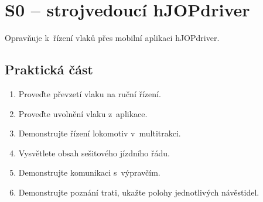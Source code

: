 \documentclass[12pt,a4paper]{article}
\begin{document}
\newpage

\section{S0 – strojvedoucí hJOPdriver}

Opravňuje k~řízení vlaků přes mobilní aplikaci hJOPdriver.

\subsection{Praktická část}

\begin{enumerate}[leftmargin=*]
\item Proveďte převzetí vlaku na ruční řízení.
\item Proveďte uvolnění vlaku z~aplikace.
\item Demonstrujte řízení lokomotiv v~multitrakci.
\item Vysvětlete obsah sešitového jízdního řádu.
\item Demonstrujte komunikaci s~výpravčím.
\item Demonstrujte poznání trati, ukažte polohy jednotlivých návěstidel.
\end{enumerate}
\end{document}
